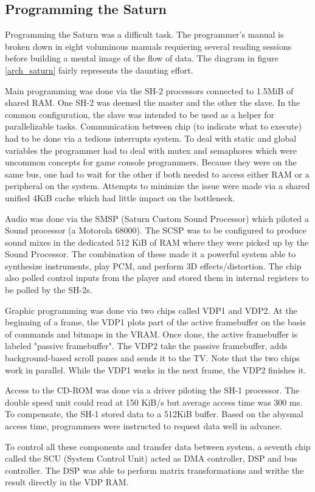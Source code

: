 \subsection{Programming the Saturn}
Programming the Saturn was a difficult task. The programmer's manual is broken down in eight voluminous manuals requiering several reading sessions before building a mental image of the flow of data. The diagram in figure \ref{arch_saturn} fairly represents the daunting effort.\\
\par
Main programming was done via the SH-2 processors connected to 1.5MiB of shared RAM. One SH-2 was deemed the master and the other the slave. In the common configuration, the slave was intended to be used as a helper for parallelizable tasks. Communication between chip (to indicate what to execute) had to be done via a tedious interrupts system. To deal with static and global variables the programmer had to deal with mutex and semaphores which were uncommon concepts for game console programmers. Because they were on the same bus, one had to wait for the other if both needed to access either RAM or a peripheral on the system. Attempts to minimize the issue were made via a shared unified 4KiB cache which had little impact on the bottleneck.\\
\par
Audio was done via the SMSP (Saturn Custom Sound Processor) which piloted a Sound processor (a Motorola 68000). The SCSP was to be configured to produce sound mixes in the dedicated 512 KiB of RAM where they were picked up by the Sound Processor. The combination of these made it a powerful system able to synthesize instruments, play PCM, and perform 3D effects/distortion. The chip also polled control inputs from the player and stored them in internal registers to be polled by the SH-2s.\\
\par
Graphic programming was done via two chips called VDP1 and VDP2. At the beginning of a frame, the VDP1 plots part of the active framebuffer on the basis of commands and bitmaps in the VRAM. Once done, the active framebuffer is labeled "passive framebuffer". The VDP2 take the passive framebuffer, adds background-based scroll panes and sends it to the TV. Note that the two chips work in parallel. While the VDP1 works in the next frame, the VDP2 finishes it.\\
\par
Access to the CD-ROM was done via a driver piloting the SH-1 processor. The double speed unit could read at 150 KiB/s but average access time was 300 ms. To compensate, the SH-1 stored data to a 512KiB buffer. Based on the abysmal access time, programmers were instructed to request data well in advance.\\ 
\par
To control all these components and transfer data between system, a seventh chip called the SCU (System Control Unit) acted as DMA controller, DSP and bus controller. The DSP was able to perform matrix transformations and writhe the result directly in the VDP RAM.\\
\par


